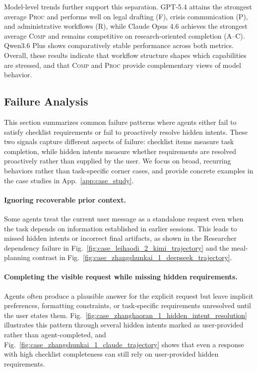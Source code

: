 \documentclass{llmxive}
\begin{document}
Model-level trends further support this separation. GPT-5.4 attains the strongest average \textsc{Proc} and performs well on legal drafting (F), crisis communication (P), and administrative workflows (R), while Claude Opus 4.6 achieves the strongest average \textsc{Comp} and remains competitive on research-oriented completion (A--C). Qwen3.6 Plus shows comparatively stable performance across both metrics. Overall, these results indicate that workflow structure shapes which capabilities are stressed, and that \textsc{Comp} and \textsc{Proc} provide complementary views of model behavior.

\subsection{Failure Analysis}
\label{app:failure_analysis}

This section summarizes common failure patterns where agents either fail to satisfy checklist requirements or fail to proactively resolve hidden intents. These two signals capture different aspects of failure: checklist items measure task completion, while hidden intents measure whether requirements are resolved proactively rather than supplied by the user. We focus on broad, recurring behaviors rather than task-specific corner cases, and provide concrete examples in the case studies in App.~\ref{app:case_study}.

\paragraph{Ignoring recoverable prior context.}
Some agents treat the current user message as a standalone request even when the task depends on information established in earlier sessions. This leads to missed hidden intents or incorrect final artifacts, as shown in the Researcher dependency failure in Fig.~\ref{fig:case_leihaodi_2_kimi_trajectory} and the meal-planning contrast in Fig.~\ref{fig:case_zhangshunkai_1_deepseek_trajectory}.

\paragraph{Completing the visible request while missing hidden requirements.}
Agents often produce a plausible answer for the explicit request but leave implicit preferences, formatting constraints, or task-specific requirements unresolved until the user states them. Fig.~\ref{fig:case_zhanghaoran_1_hidden_intent_resolution} illustrates this pattern through several hidden intents marked as user-provided rather than agent-completed, and Fig.~\ref{fig:case_zhangshunkai_1_claude_trajectory} shows that even a response with high checklist completeness can still rely on user-provided hidden requirements.
\end{document}
